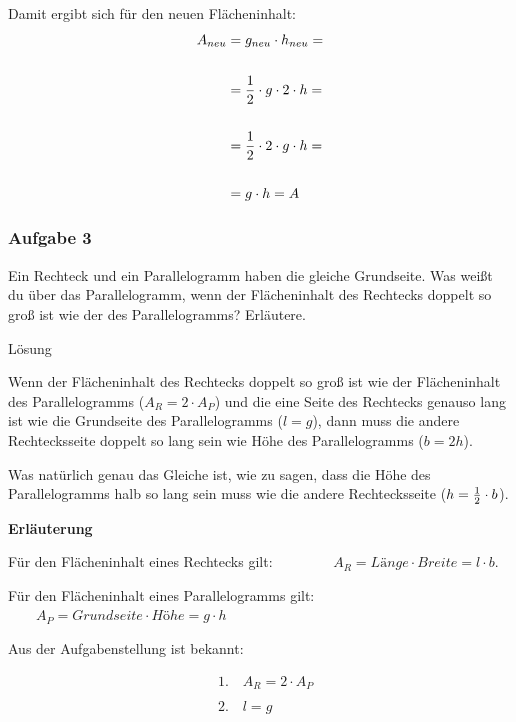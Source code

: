 \documentclass[
  ngerman,
]{book}
\begin{document}
Damit ergibt sich für den neuen Flächeninhalt:
\[\begin{align} A_{neu} &= g_{neu} \cdot h_{neu} = \\
{}\\
& = {1 \over 2} \cdot g \cdot 2 \cdot h =\\
{}\\
& = {1 \over 2} \cdot 2 \cdot g \cdot h =\\
{}\\
&= g \cdot h = A \end{align}\]

\hypertarget{section-8}{%
\subsubsection*{}\label{section-8}}

\hypertarget{aufgabe-3-2}{%
\subsubsection*{Aufgabe 3}\label{aufgabe-3-2}}

Ein Rechteck und ein Parallelogramm haben die gleiche Grundseite. Was weißt du über das Parallelogramm, wenn der Flächeninhalt des Rechtecks doppelt so groß ist wie der des Parallelogramms? Erläutere.

Lösung

Wenn der Flächeninhalt des Rechtecks doppelt so groß ist wie der Flächeninhalt des Parallelogramms (\(A_R = 2 \cdot A_P\)) und die eine Seite des Rechtecks genauso lang ist wie die Grundseite des Parallelogramms (\(l=g\)), dann muss die andere Rechtecksseite doppelt so lang sein wie Höhe des Parallelogramms (\(b=2h\)).

Was natürlich genau das Gleiche ist, wie zu sagen, dass die Höhe des Parallelogramms halb so lang sein muss wie die andere Rechtecksseite (\(h={1 \over 2} \cdot b\)).

\textbf{Erläuterung}

Für den Flächeninhalt eines Rechtecks gilt: \(\quad\quad\quad\quad A_{R}= Länge \cdot Breite = l \cdot b\).

Für den Flächeninhalt eines Parallelogramms gilt: \(\quad\quad A_{P} = Grundseite \cdot Höhe = g \cdot h\)

Aus der Aufgabenstellung ist bekannt:

\[\begin{align} &1. \quad A_{R} = 2 \cdot A_{P} \\
                {}\\
                &2. \quad l = g \end{align}\]
\end{document}
